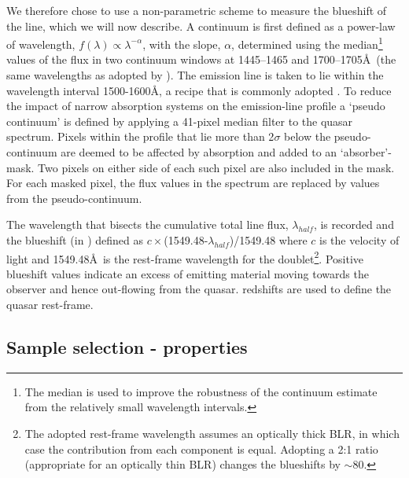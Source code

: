 We therefore chose to use a non-parametric scheme to measure the blueshift of the  line, which we will now describe. 
A continuum is first defined as a power-law of wavelength, $f(\lambda) \propto \lambda^{-\alpha}$, with the slope, $\alpha$, determined using the median\footnote{The median is used to improve the robustness of the continuum estimate from the relatively small wavelength intervals.} values of the flux in two continuum windows at 1445--1465 and 1700--1705\AA\, (the same wavelengths as adopted by \citet{shen11}). 
The  emission line is taken to lie within the wavelength interval 1500-1600\AA, a recipe that is commonly adopted \citep[e.g.][]{shen11, denney13}. 
To reduce the impact of narrow absorption systems on the emission-line profile a `pseudo continuum' is defined by applying a 41-pixel median filter to the quasar spectrum.
Pixels within the  profile that lie more than 2$\sigma$ below the pseudo-continuum are deemed to be affected by absorption and added to an `absorber'-mask. 
Two pixels on either side of each such pixel are also included in the mask. 
For each masked pixel, the flux values in the spectrum are replaced by values from the pseudo-continuum. 

The wavelength that bisects the cumulative total line flux, $\lambda_{half}$, is recorded and the blueshift (in \kms) defined as $c\times$(1549.48-$\lambda_{half}$)/1549.48 where $c$ is the velocity of light and 1549.48\AA \ is the rest-frame wavelength for the  doublet\footnote{The adopted  rest-frame wavelength assumes an optically thick BLR, in which case the contribution from each component is equal. Adopting a 2:1 ratio (appropriate for an optically thin BLR) changes the blueshifts by $\sim$80\kms.}. 
Positive blueshift values indicate an excess of emitting material moving towards the observer and hence out-flowing from the quasar.
\citet{hewett10} redshifts are used to define the quasar rest-frame. 

\subsection{Sample selection -  properties}

